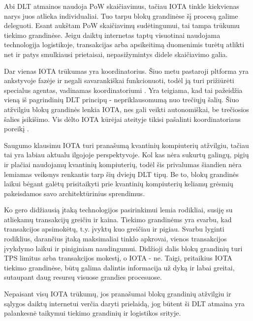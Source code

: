 Abi DLT atmainos naudoja PoW skaičiavimus, tačiau IOTA tinkle kiekvienas narys juos atlieka individualiai. Tuo tarpu blokų grandinėse šį procesą galime deleguoti. Esant aukštam PoW skaičiavimų sudėtingumui, tai tampa trūkumu tiekimo grandinėse. Jeigu daiktų internetas taptų visuotinai naudojama technologija logistikoje, transakcijas arba apsikeitimą duomenimis turėtų atlikti net ir patys smulkiausi prietaisai, nepasižymintys didele skaičiavimo galia.

Dar vienas IOTA trūkumas yra koordinatorius. Šiuo metu pastaroji pltforma yra ankstyvoje fazėje ir negali savarankiškai funkcionuoti, todėl ją turi prižiūrėti specialus agentas, vadinamas koordinatoriumi \cite{bramas2018stability}. Yra teigiama, kad tai pažeidžia vieną iš pagrindinių DLT principų - nepriklausomumą nuo trečiųjų šalių. Šiuo atžvilgiu blokų grandinės lenkia IOTA, nes gali veikti autonomiškai, be trečiosios šalies įsikišimo. Vis dėlto IOTA kūrėjai ateityje tikisi pašalinti koordinatoriaus poreikį \cite{bramas2018stability}.

Saugumo klausimu IOTA turi pranašumą kvantinių kompiuterių atžvilgiu, tačiau tai yra labiau aktualu ilgojoje perspektyvoje. Kol kas nėra sukurtų galingų, pigių ir plačiai naudojamų kvantinių kompiuterių, todėl šis privalumas šiandien nėra lemiamas veiksnys renkantis tarp šių dviejų DLT tipų. Be to, blokų grandinės laikui bėgant galėtų prisitaikyti prie kvantinių kompiuterių keliamų grėsmių pakeisdamos savo architektūrinius sprendimus.

Ko gero didžiausią įtaką technologijos pasirinkimui lemia rodikliai, susiję su atliekamų transakcijų greičiu ir kaina. Tiekimo grandinėms yra svarbu, kad transakcijos apsimokėtų, t.y. įvyktų kuo greičiau ir pigiau. Svarbu lyginti rodiklius, darančius įtaką maksimaliai tinklo apkrovai, vienos transakcijos įvykdymo laikui ir piniginiam naudingumui. Didžioji dalis blokų grandinių turi TPS limitus arba transakcijos mokestį, o IOTA - ne. Taigi, pritaikius IOTA tiekimo grandinėse, būtų galima dalintis informacija už dyką ir labai greitai, sutaupant daug resursų visuose grandies procesuose.

Nepaisant visų IOTA trūkumų, jos pranašumai blokų grandinių atžvilgiu ir sąlygos daiktų internetui verčia daryti prielaidą, jog būtent ši DLT atmaina yra palankesnė taikymui tiekimo grandinių ir logistikos srityje. 